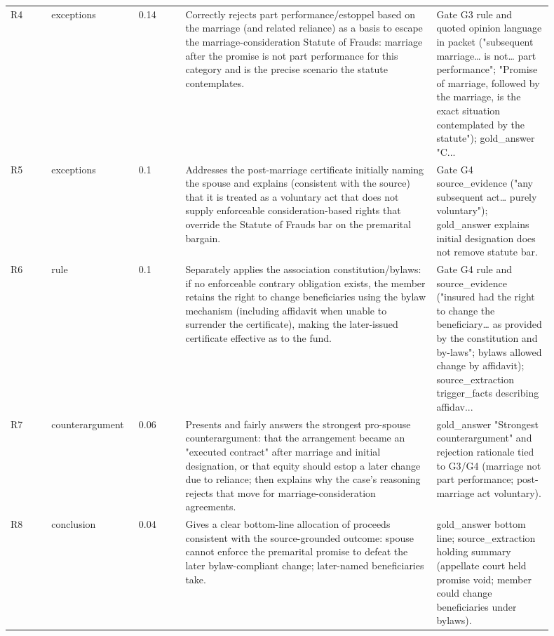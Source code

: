 \begin{longtable}{p{0.07\linewidth}p{0.12\linewidth}p{0.08\linewidth}p{0.43\linewidth}p{0.20\linewidth}}
R4 & exceptions & 0.14 & Correctly rejects part performance/estoppel based on the marriage (and related reliance) as a basis to escape the marriage-consideration Statute of Frauds: marriage after the promise is not part performance for this category and is the precise scenario the statute contemplates. & Gate G3 rule and quoted opinion language in packet ("subsequent marriage… is not… part performance"; "Promise of marriage, followed by the marriage, is the exact situation contemplated by the statute"); gold\_answer "C... \\
R5 & exceptions & 0.1 & Addresses the post-marriage certificate initially naming the spouse and explains (consistent with the source) that it is treated as a voluntary act that does not supply enforceable consideration-based rights that override the Statute of Frauds bar on the premarital bargain. & Gate G4 source\_evidence ("any subsequent act… purely voluntary"); gold\_answer explains initial designation does not remove statute bar. \\
R6 & rule & 0.1 & Separately applies the association constitution/bylaws: if no enforceable contrary obligation exists, the member retains the right to change beneficiaries using the bylaw mechanism (including affidavit when unable to surrender the certificate), making the later-issued certificate effective as to the fund. & Gate G4 rule and source\_evidence ("insured had the right to change the beneficiary… as provided by the constitution and by-laws"; bylaws allowed change by affidavit); source\_extraction trigger\_facts describing affidav... \\
R7 & counterargument & 0.06 & Presents and fairly answers the strongest pro-spouse counterargument: that the arrangement became an "executed contract" after marriage and initial designation, or that equity should estop a later change due to reliance; then explains why the case's reasoning rejects that move for marriage-consideration agreements. & gold\_answer "Strongest counterargument" and rejection rationale tied to G3/G4 (marriage not part performance; post-marriage act voluntary). \\
R8 & conclusion & 0.04 & Gives a clear bottom-line allocation of proceeds consistent with the source-grounded outcome: spouse cannot enforce the premarital promise to defeat the later bylaw-compliant change; later-named beneficiaries take. & gold\_answer bottom line; source\_extraction holding summary (appellate court held promise void; member could change beneficiaries under bylaws). \\

\end{longtable}
